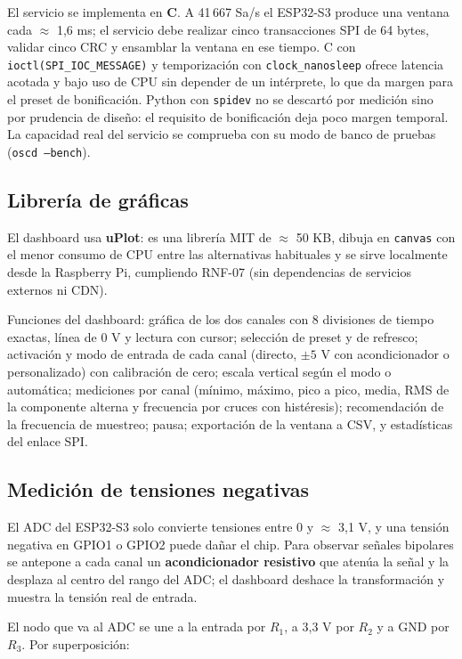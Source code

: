 \documentclass[12pt,a4paper]{article}
\begin{document}
El servicio se implementa en \textbf{C}. A 41\,667 Sa/s el ESP32-S3 produce una ventana cada $\approx$ 1{,}6 ms; el servicio debe realizar cinco transacciones SPI de 64 bytes, validar cinco CRC y ensamblar la ventana en ese tiempo. C con \texttt{ioctl(SPI\_IOC\_MESSAGE)} y temporización con \texttt{clock\_nanosleep} ofrece latencia acotada y bajo uso de CPU sin depender de un intérprete, lo que da margen para el preset de bonificación. Python con \texttt{spidev} no se descartó por medición sino por prudencia de diseño: el requisito de bonificación deja poco margen temporal. La capacidad real del servicio se comprueba con su modo de banco de pruebas (\texttt{oscd --bench}).

\subsection{Librería de gráficas}

El dashboard usa \textbf{uPlot}: es una librería MIT de $\approx$ 50 KB, dibuja en \texttt{canvas} con el menor consumo de CPU entre las alternativas habituales y se sirve localmente desde la Raspberry Pi, cumpliendo RNF-07 (sin dependencias de servicios externos ni CDN).

Funciones del dashboard: gráfica de los dos canales con 8 divisiones de tiempo exactas, línea de 0 V y lectura con cursor; selección de preset y de refresco; activación y modo de entrada de cada canal (directo, $\pm 5$ V con acondicionador o personalizado) con calibración de cero; escala vertical según el modo o automática; mediciones por canal (mínimo, máximo, pico a pico, media, RMS de la componente alterna y frecuencia por cruces con histéresis); recomendación de la frecuencia de muestreo; pausa; exportación de la ventana a CSV, y estadísticas del enlace SPI.

\subsection{Medición de tensiones negativas}

El ADC del ESP32-S3 solo convierte tensiones entre 0 y $\approx$ 3{,}1 V, y una tensión negativa en GPIO1 o GPIO2 puede dañar el chip. Para observar señales bipolares se antepone a cada canal un \textbf{acondicionador resistivo} que atenúa la señal y la desplaza al centro del rango del ADC; el dashboard deshace la transformación y muestra la tensión real de entrada.

El nodo que va al ADC se une a la entrada por $R_1$, a 3{,}3 V por $R_2$ y a GND por $R_3$. Por superposición:
\end{document}
